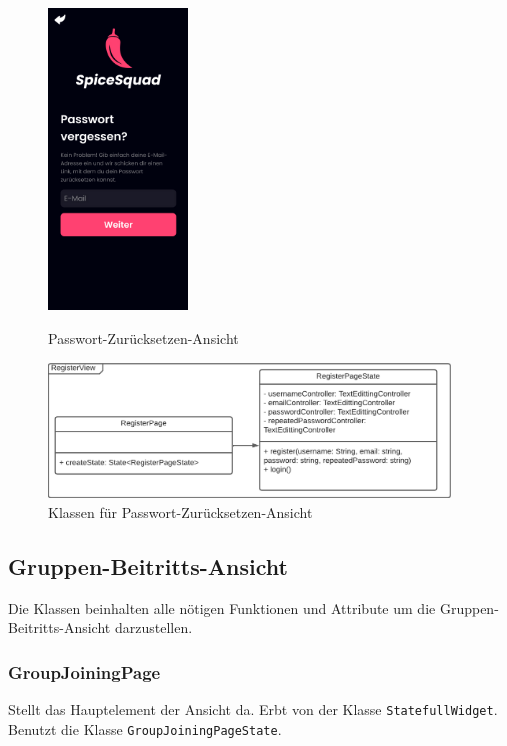\documentclass{entwurfsheft}
\begin{document}
            \begin{figure}[htp]
                \begin{minipage}
                    [t]{0.49\textwidth}
                    \centering
                    \includegraphics[height=80mm]{images/Presentation-layer/PasswordResetView.jpg}
                    \caption{Passwort-Zurücksetzen-Ansicht}
                \end{minipage}
                \begin{minipage}
                    [t]{0.49\textwidth}
                    \centering
                    \includegraphics[width=0.95\textwidth]{images/Presentation-layer/PasswordResetViewClass.pdf}
                    \caption{Klassen für Passwort-Zurücksetzen-Ansicht}
                \end{minipage}
            \end{figure} 
        
            \newpage

\subsection{Gruppen-Beitritts-Ansicht}
    Die Klassen beinhalten alle nötigen Funktionen und Attribute um die Gruppen-Beitritts-Ansicht darzustellen.

    \subsubsection{GroupJoiningPage}
        Stellt das Hauptelement der Ansicht da. Erbt von der Klasse \texttt{StatefullWidget}. Benutzt die Klasse \texttt{GroupJoiningPageState}. 
\end{document}

